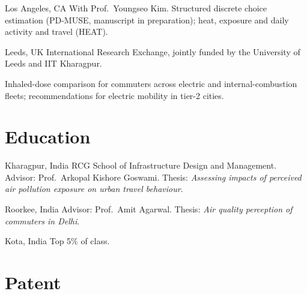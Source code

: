 \documentclass[10pt, a4paper]{article}
\begin{document}
\begin{cvlist}[6pt]
    {Los Angeles, CA}
    {With Prof.\ Youngseo Kim. Structured discrete choice estimation (PD-MUSE, manuscript in
     preparation); heat, exposure and daily activity and travel (HEAT).}

    {Leeds, UK}
    {International Research Exchange, jointly funded by the University of Leeds and IIT Kharagpur.}

    {Inhaled-dose comparison for commuters across electric and internal-combustion fleets;
     recommendations for electric mobility in tier-2 cities.}
\end{cvlist}

\section{Education}

\begin{cvlist}[6pt]
    {Kharagpur, India}
    {RCG School of Infrastructure Design and Management. Advisor: Prof.\ Arkopal Kishore Goswami.
     Thesis: \emph{Assessing impacts of perceived air pollution exposure on urban travel
     behaviour}.}

    {Roorkee, India}
    {Advisor: Prof.\ Amit Agarwal. Thesis: \emph{Air quality perception of commuters in Delhi}.}

    {Kota, India}
    {Top 5\% of class.}
\end{cvlist}

\section{Patent}

\begin{cvlist}
\end{cvlist}
\end{document}
